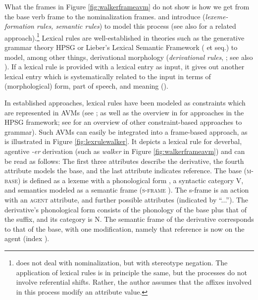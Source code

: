 What the frames in Figure \ref{fig:walkerframeavm} do not show is how we get from the base verb frame to the nominalization frames. 
\citet{Andreou.2017} and \citet{Plag.2018} introduce  (\textit{lexeme-formation rules, semantic rules}) to model this process (see also \citealt{Schulzek.forthcoming} for a related approach).\footnote{\citet{Andreou.2017} does not deal with nominalization, but with stereotype negation. The application of lexical rules is in principle the same, but the processes do not involve referential shifts. Rather, the author assumes that the affixes involved in this process modify an attribute value.} 
Lexical rules are well-established in theories such as the generative grammar theory HPSG or Lieber's Lexical Semantic Framework (\citealt{Lieber.2004} et seq.) to model, among other things, derivational morphology (\textit{derivational rules}, \citealt[194]{Sag.1999}; see also \citealt{Bredenkamp.1996}). 
If a lexical rule is provided with a lexical entry as input, it gives out another lexical entry which is systematically related to the input in terms of (morphological) form, part of speech, and meaning (\citealt[185]{Sag.1999}). 

\begin{sloppypar}
In established approaches, lexical rules have been modeled as constraints which are represented in AVMs (see \citealt{Pollard.1994,Riehemann.1998,Koenig.1999}; as well as the overview in \citealt{Mueller.2015} for approaches in the HPSG framework; see \citealt{Bonami.2016} for an overview of other constraint-based approaches to grammar).
Such AVMs can easily be integrated into a frame-based approach, as is illustrated in Figure \ref{fig:lexrulewalker}. It depicts a lexical rule for deverbal, agentive \textit{-er} derivation (such as \textit{walker} in Figure \ref{fig:walkerframeavm}) and can be read as follows:
The first three attributes describe the derivative, the fourth attribute models the base, and the last attribute indicates reference. 
The base (\textsc{m-base}) is defined as a lexeme with a phonological form , a syntactic category V, and semantics modeled as a semantic frame (\textsc{s-frame} ). The s-frame is an action with an \textsc{agent} attribute, and further possible attributes (indicated by ``...''). 
The derivative's phonological form consists of the phonology of the base plus that of the suffix, and its category is N. 
The semantic frame of the derivative corresponds to that of the base, with one modification, namely that reference is now on the agent (index ). 
\end{sloppypar}

